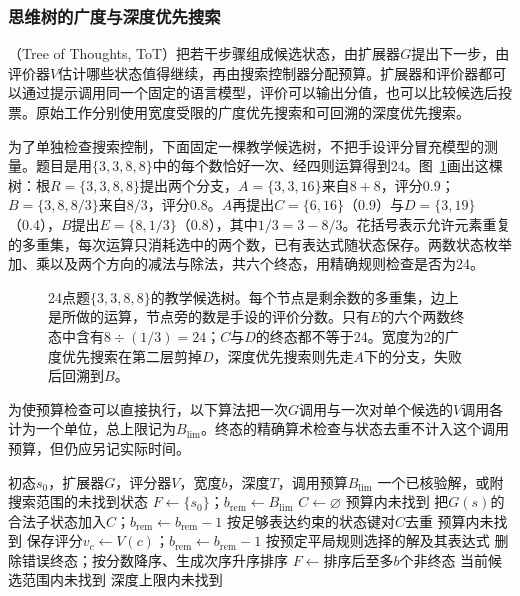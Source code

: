 \subsubsection{思维树的广度与深度优先搜索}
\label{sec:nlp-execution-tot}

（Tree of Thoughts, ToT）把若干步骤组成候选状态，由扩展器$G$提出下一步，由评价器$V$估计哪些状态值得继续，再由搜索控制器分配预算。扩展器和评价器都可以通过提示调用同一个固定的语言模型，评价可以输出分值，也可以比较候选后投票。原始工作分别使用宽度受限的广度优先搜索和可回溯的深度优先搜索。

为了单独检查搜索控制，下面固定一棵教学候选树，不把手设评分冒充模型的测量。题目是用$\{3,3,8,8\}$中的每个数恰好一次、经四则运算得到24。图~\ref{fig:nlp-reasoning-tot-tree}画出这棵树：根$R=\{3,3,8,8\}$提出两个分支，$A=\{3,3,16\}$来自$8+8$，评分0.9；$B=\{3,8,8/3\}$来自$8/3$，评分0.8。$A$再提出$C=\{6,16\}$（0.9）与$D=\{3,19\}$（0.4），$B$提出$E=\{8,1/3\}$（0.8），其中$1/3=3-8/3$。花括号表示允许元素重复的多重集，每次运算只消耗选中的两个数，已有表达式随状态保存。两数状态枚举加、乘以及两个方向的减法与除法，共六个终态，用精确规则检查是否为24。

\begin{figure}[tbp]
  \centering
  
  \caption{24点题$\{3,3,8,8\}$的教学候选树。每个节点是剩余数的多重集，边上是所做的运算，节点旁的数是手设的评价分数。只有$E$的六个两数终态中含有$8\div(1/3)=24$；$C$与$D$的终态都不等于24。宽度为2的广度优先搜索在第二层剪掉$D$，深度优先搜索则先走$A$下的分支，失败后回溯到$B$。}
  \label{fig:nlp-reasoning-tot-tree}
\end{figure}

为使预算检查可以直接执行，以下算法把一次$G$调用与一次对单个候选的$V$调用各计为一个单位，总上限记为$B_{\mathrm{lim}}$。终态的精确算术检查与状态去重不计入这个调用预算，但仍应另记实际时间。

\begin{algorithm}[宽度受限的ToT广度优先搜索]
\label{alg:nlp-execution-tot-bfs}
\begin{algorithmic}[1]
\Require 初态$s_0$，扩展器$G$，评分器$V$，宽度$b$，深度$T$，调用预算$B_{\mathrm{lim}}$
\Ensure 一个已核验解，或附搜索范围的未找到状态
\State $F\gets\{s_0\}$；$b_{\mathrm{rem}}\gets B_{\mathrm{lim}}$
  \State $C\gets\varnothing$
     \State \Return 预算内未找到 \EndIf
    \State 把$G(s)$的合法子状态加入$C$；$b_{\mathrm{rem}}\gets b_{\mathrm{rem}}-1$
  \EndFor
  \State 按足够表达约束的状态键对$C$去重
     \State \Return 预算内未找到 \EndIf
    \State 保存评分$v_c\gets V(c)$；$b_{\mathrm{rem}}\gets b_{\mathrm{rem}}-1$
  \EndFor
    \State \Return 按预定平局规则选择的解及其表达式
  \EndIf
  \State 删除错误终态；按分数降序、生成次序升序排序
  \State $F\gets$排序后至多$b$个非终态
   \State \Return 当前候选范围内未找到 \EndIf
\EndFor
\State \Return 深度上限内未找到
\end{algorithmic}
\end{algorithm}

